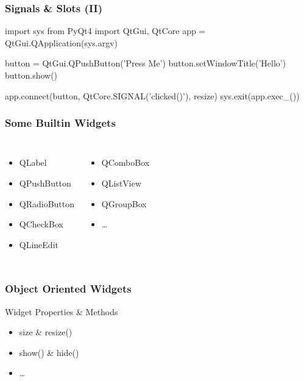 \begin{frame}[fragile]
\frametitle{Signals \& Slots (II)}

\begin{python}
import sys
from PyQt4 import QtGui, QtCore
app = QtGui.QApplication(sys.argv)

button = QtGui.QPushButton('Press Me')
button.setWindowTitle('Hello')
button.show()

app.connect(button, QtCore.SIGNAL('clicked()'), resize)
sys.exit(app.exec_())

\end{python}
\end{frame}

\begin{frame}[fragile]
\frametitle{Some Builtin Widgets}
\begin{columns}
\begin{itemize}
\item QLabel
\item QPushButton
\item QRadioButton
\item QCheckBox
\item QLineEdit
\end{itemize}
\begin{itemize}
\item QComboBox
\item QListView
\item QGroupBox
\item \ldots
\end{itemize}
\end{columns}
\end{frame}

\begin{frame}[fragile]
\frametitle{Object Oriented Widgets}
\begin{block}{Widget Properties \& Methods}
\begin{itemize}
\item size \& resize()
\item show() \& hide()
\item \ldots
\end{itemize}
\end{block}
\end{frame}

